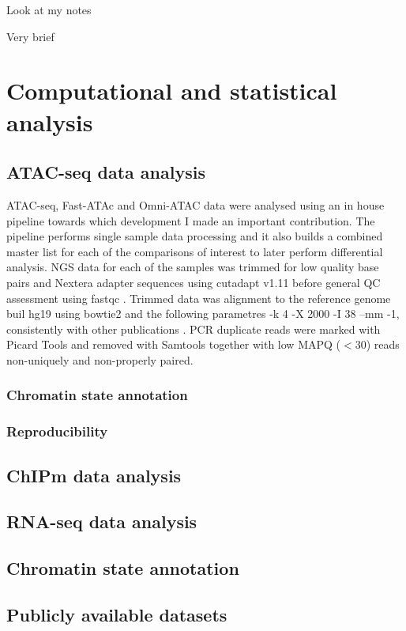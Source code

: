 Look at my notes

Very brief

\section{Computational and statistical analysis}
\subsection{ATAC-seq data analysis}
ATAC-seq, Fast-ATAc and Omni-ATAC data were analysed using an in house pipeline towards which development I made an important contribution. The pipeline performs single sample data processing and it also builds a combined master list for each of the comparisons of interest to later perform differential analysis. 
NGS data for each of the samples was trimmed for low quality base pairs and Nextera adapter sequences using cutadapt v1.11 \parencite{} before general QC assessment using fastqc \parencite{}. Trimmed data was alignment to the reference genome buil hg19 using bowtie2 \parencite{} and the following parametres -k 4 -X 2000 -I 38 --mm -1, consistently with other publications \parencite{Buenrostro2013, Corces2016}. PCR duplicate reads were marked with Picard Tools \parencite{} and removed with Samtools \parencite{} together with low MAPQ  (${<}$30) reads non-uniquely and non-properly paired.





		\subsubsection{Chromatin state annotation}
		\subsubsection{Reproducibility}
		
\subsection{ChIPm data analysis}

\subsection{RNA-seq data analysis}

\subsection{Chromatin state annotation}

\subsection{Publicly available datasets}


